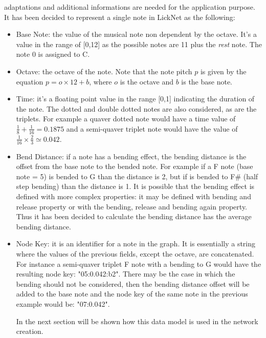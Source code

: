 \documentclass{llncs}
\begin{document}
adaptations and additional 
informations are needed for the application purpose. It has been decided
to represent a single note in LickNet as the following:
\begin{itemize}
	\item Base Note: the value of the musical note non dependent by the octave. It's
a value in the range of [0,12] as the possible notes are 11 plus the
\emph{rest} note. The note 0 is assigned to C.
	\item Octave: the octave of the note. Note that the note pitch $p$ is given
by the equation $p = o \times 12 + b $, where $o$ is the octave and $b$
is the base note.
	\item Time: it's a floating point value in the range [0,1] indicating the duration of
the note. The dotted and double dotted notes are also considered, as are
the triplets. For example a quaver dotted note would have a
time value of $\frac{1}{8} + \frac{1}{16} = 0.1875$ and a semi-quaver triplet note
would have the value of $\frac{1}{16} \times \frac{2}{3} \simeq 0.042$.
	\item Bend Distance: if a note has a bending effect, the bending
distance is the offset from the base note to the bended note. For
example if a F note (base note = 5) is bended to G than the distance is
2, but if is bended to F\# (half step bending) than the distance is 1. It
is possible that the bending effect is defined with more complex
properties: it may be defined with bending and release property or with the bending,
release and bending again property. Thus it has been decided to calculate
the bending distance has the average bending distance.
	\item Node Key: it is an identifier for a note in the graph. It is
essentially a string where the values of the previous fields, except the
octave, are
concatenated. For instance a semi-quaver triplet F note with a bending
to G would have the resulting node key: "05:0.042:b2". There may be the
case in which the bending should not be considered, then the bending distance offset 
will be added to the base note and the node key of the same note in the
previous example would be: "07:0.042".

In the next section will be shown how this data model is used in the
network creation.
\end{itemize}
\end{document}
